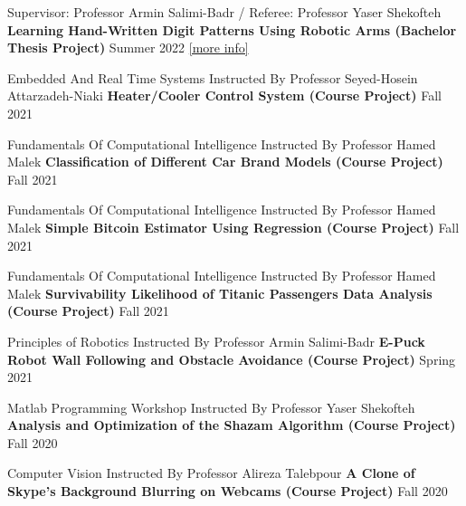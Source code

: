 
\begin{cventries}
    \cventry
    {Supervisor: Professor Armin Salimi-Badr / Referee: Professor Yaser Shekofteh}
    {\textbf {Learning Hand-Written Digit Patterns Using Robotic Arms (Bachelor Thesis Project)}}
    {}
    {Summer 2022}
    {\href{https://ph504.github.io/portfolio/portfolio-1/}{\textcolor{cobalt}{[more info]}}\newline}
    \vspace{0.35 cm}
    
    \cventry
    {Embedded And Real Time Systems Instructed By Professor Seyed-Hosein Attarzadeh-Niaki}
    {\textbf {Heater/Cooler Control System (Course Project)}}
    {}
    {Fall 2021}
    {}
    \vspace{0.35 cm}
    
      \cventry
    {Fundamentals Of Computational Intelligence Instructed By Professor Hamed Malek}
    {\textbf {Classification of Different Car Brand Models (Course Project)}}
    {}
    {Fall 2021}
    {}
    \vspace{0.35 cm}
	
	    \cventry
    {Fundamentals Of Computational Intelligence Instructed By Professor Hamed Malek}
    {\textbf {Simple Bitcoin Estimator Using Regression (Course Project)}}
    {}
    {Fall 2021}
    {}
    \vspace{0.35 cm}

      \cventry
    {Fundamentals Of Computational Intelligence Instructed By Professor Hamed Malek}
    {\textbf {Survivability Likelihood of Titanic Passengers Data Analysis (Course Project)}}
    {}
    {Fall 2021}
    {}
    \vspace{0.35 cm}
    
    \cventry
    {Principles of Robotics Instructed By Professor Armin Salimi-Badr}
    {\textbf {E-Puck Robot Wall Following and Obstacle Avoidance (Course Project)}}
    {}
    {Spring 2021}
    {}
    \vspace{0.35 cm}
    
    \cventry
    {Matlab Programming Workshop Instructed By Professor Yaser Shekofteh}
    {\textbf {Analysis and Optimization of the Shazam Algorithm (Course Project)}}
    {}
    {Fall 2020}
    {}
    \vspace{0.35 cm}
    
    \cventry
    {Computer Vision Instructed By Professor Alireza Talebpour}
    {\textbf {A Clone of Skype's Background Blurring on Webcams (Course Project)}}
    {}
    {Fall 2020}
    {}
    \vspace{0.35 cm}


\end{cventries}
